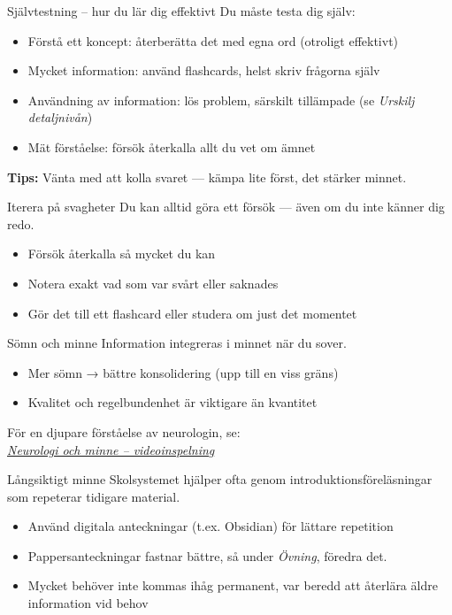 \documentclass[presentation]{beamer}
\begin{document}
\begin{frame}{Självtestning – hur du lär dig effektivt}
Du måste testa dig själv:

\begin{itemize}
    \item Förstå ett koncept: återberätta det med egna ord (otroligt effektivt)
    \item Mycket information: använd flashcards, helst skriv frågorna själv
    \item Användning av information: lös problem, särskilt tillämpade (se \textit{Urskilj detaljnivån})
    \item Mät förståelse: försök återkalla allt du vet om ämnet
\end{itemize}

\textbf{Tips:} Vänta med att kolla svaret --- kämpa lite först, det stärker minnet.
\end{frame}

\begin{frame}{Iterera på svagheter}
Du kan alltid göra ett försök --- även om du inte känner dig redo.

\begin{itemize}
    \item Försök återkalla så mycket du kan
    \item Notera exakt vad som var svårt eller saknades
    \item Gör det till ett flashcard eller studera om just det momentet
\end{itemize}
\end{frame}

\begin{frame}{Sömn och minne}
Information integreras i minnet när du sover.

\begin{itemize}
    \item Mer sömn → bättre konsolidering (upp till en viss gräns)
    \item Kvalitet och regelbundenhet är viktigare än kvantitet
\end{itemize}

För en djupare förståelse av neurologin, se:\\
\href{https://www.youtube.com/watch?v=ceFFEmkxTLg}{\textit{Neurologi och minne – videoinspelning}}
\end{frame}

\begin{frame}{Långsiktigt minne}
Skolsystemet hjälper ofta genom introduktionsföreläsningar som repeterar tidigare material.

\begin{itemize}
  \item Använd digitala anteckningar (t.ex. Obsidian) för lättare repetition
  \item Pappersanteckningar fastnar bättre, så under \textit{Övning}, föredra det.
  \item Mycket behöver inte kommas ihåg permanent, var beredd att återlära äldre information vid behov
\end{itemize}
\end{frame}
\end{document}
